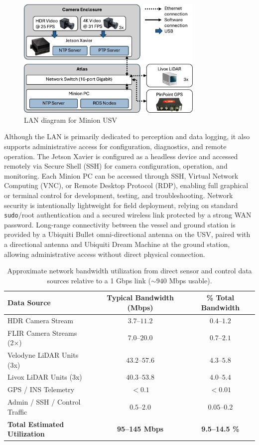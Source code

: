 \documentclass{erauthesis}
\begin{document}
\begin{figure}[htbp]
\centering
\includegraphics[width=0.8\textwidth]{Images/network_diagram2.png}
\caption{LAN diagram for Minion USV}
\label{fig:network_diagram}
\end{figure}

Although the LAN is primarily dedicated to perception and data logging, it also supports administrative access for configuration, diagnostics, and remote operation.
The Jetson Xavier is configured as a headless device and accessed remotely via Secure Shell (SSH) for camera configuration, operation, and monitoring.
Each Minion PC can be accessed through SSH, Virtual Network Computing (VNC), or Remote Desktop Protocol (RDP), enabling full graphical or terminal control for development, testing, and troubleshooting.
Network security is intentionally lightweight for field deployment, relying on standard \texttt{sudo}/root authentication and a secured wireless link protected by a strong \ac{WAN} password.
Long-range connectivity between the vessel and ground station is provided by a Ubiquiti Bullet omni-directional antenna on the \ac{USV}, paired with a directional antenna and Ubiquiti Dream Machine at the ground station, allowing administrative access without direct physical connection.




\begin{table}[htbp]
\centering
\begin{tabular}{lcc}
\hline
Data Source & Typical Bandwidth (Mbps) & \% Total Bandwidth \\
\hline
HDR Camera Stream & $3.7$--$11.2$ & $0.4$--$1.2$ \\
FLIR Camera Streams (2×) & $7.0$--$20.0$ & $0.7$--$2.1$ \\
Velodyne LiDAR Units (3x) & $43.2$--$57.6$ & $4.3$--$5.8$ \\
Livox LiDAR Units (3x) & $40.3$--$53.8$ & $4.0$--$5.4$ \\
GPS / INS Telemetry & $<0.1$ & $<0.01$ \\
Admin / SSH / Control Traffic & $0.5$--$2.0$ & $0.05$--$0.2$ \\
\hline
\textbf{Total Estimated Utilization} & \textbf{95--145 Mbps} & \textbf{9.5--14.5 \%} \\
\hline
\end{tabular}
\caption{Approximate network bandwidth utilization from direct sensor and control data sources relative to a 1 Gbps link ($\sim940$ Mbps usable).}
\label{table:network_bandwidth}
\end{table}
\end{document}

